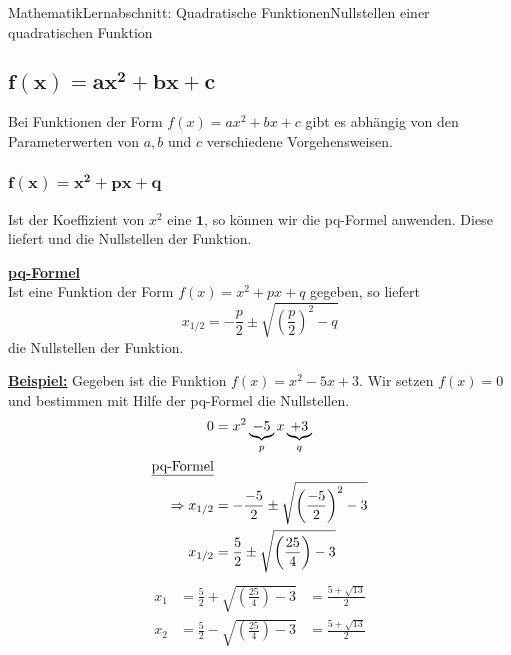 \documentclass[11pt,twocolumn,oneside,openany,headings=optiontotoc,11pt,numbers=noenddot]{article}
\begin{document}
\begin{worksheet}{Mathematik}{Lernabschnitt: Quadratische Funktionen}{Nullstellen einer quadratischen Funktion}
		\subsection{\(\mathbf{f(x) = ax^2 + bx + c}\)}
		Bei Funktionen der Form \(f(x) = ax^2 + bx +c\) gibt es abhängig von den Parameterwerten von \(a, b\) und \(c\) verschiedene Vorgehensweisen.\\
		\subsubsection*{\(\mathbf{f(x) = x^2 + px + q}\)}
		Ist der Koeffizient von \(x^2\) eine \(\mathbf{1}\), so können wir die pq-Formel anwenden. Diese liefert und die Nullstellen der Funktion.
		\begin{framed}
			\noindent
			\underline{\textbf{pq-Formel}}\\
			Ist eine Funktion der Form \(f(x) = x^2 + px + q\) gegeben, so liefert \[x_{1/2} = -\frac{p}{2}\pm \sqrt{\left(\frac{p}{2}\right)^2 - q}\] die Nullstellen der Funktion.
		\end{framed}
		\noindent
		\underline{\textbf{Beispiel:}} Gegeben ist die Funktion \(f(x) = x^2 -5x + 3\). Wir setzen \(f(x) = 0\) und bestimmen mit Hilfe der pq-Formel die Nullstellen.
		\begin{align*}
			0 & = x^2 \underbrace{- 5}_{p}x \underbrace{+ 3}_{q}\\
			\text{\underline{pq-Formel}}\\
			\Rightarrow x_{1/2} & = -\frac{-5}{2} \pm \sqrt{\left(\frac{-5}{2}\right)^2 - 3}\\
			x_{1/2} & = \frac{5}{2} \pm \sqrt{\left(\frac{25}{4}\right) - 3}\\
		\end{align*}
		\begin{align*}
			x_1 & = \frac{5}{2} + \sqrt{\left(\frac{25}{4}\right) - 3} & = \frac{5 +\sqrt{13}}{2}\\
			x_2 & = \frac{5}{2} - \sqrt{\left(\frac{25}{4}\right) - 3} & = \frac{5 +\sqrt{13}}{2}\\\\
		\end{align*}

\end{worksheet}
\end{document}
